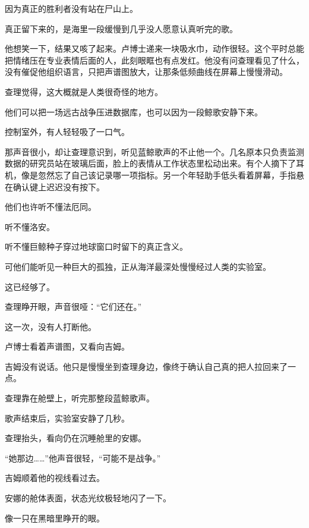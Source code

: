 因为真正的胜利者没有站在尸山上。

真正留下来的，是海里一段缓慢到几乎没人愿意认真听完的歌。

他想笑一下，结果又咳了起来。卢博士递来一块吸水巾，动作很轻。这个平时总能把情绪压在专业表情后面的人，此刻眼眶也有点发红。他没有问查理看见了什么，没有催促他组织语言，只把声谱图放大，让那条低频曲线在屏幕上慢慢滑动。

查理觉得，这大概就是人类很奇怪的地方。

他们可以把一场远古战争压进数据库，也可以因为一段鲸歌安静下来。

控制室外，有人轻轻吸了一口气。

那声音很小，却让查理意识到，听见蓝鲸歌声的不止他一个。几名原本只负责监测数据的研究员站在玻璃后面，脸上的表情从工作状态里松动出来。有个人摘下了耳机，像是忽然忘了自己该记录哪一项指标。另一个年轻助手低头看着屏幕，手指悬在确认键上迟迟没有按下。

他们也许听不懂法厄同。

听不懂洛安。

听不懂巨鲸种子穿过地球窗口时留下的真正含义。

可他们能听见一种巨大的孤独，正从海洋最深处慢慢经过人类的实验室。

这已经够了。

查理睁开眼，声音很哑：“它们还在。”

这一次，没有人打断他。

卢博士看着声谱图，又看向吉姆。

吉姆没有说话。他只是慢慢坐到查理身边，像终于确认自己真的把人拉回来了一点。

查理靠在舱壁上，听完那整段蓝鲸歌声。

歌声结束后，实验室安静了几秒。

查理抬头，看向仍在沉睡舱里的安娜。

“她那边……”他声音很轻，“可能不是战争。”

吉姆顺着他的视线看过去。

安娜的舱体表面，状态光纹极轻地闪了一下。

像一只在黑暗里睁开的眼。

